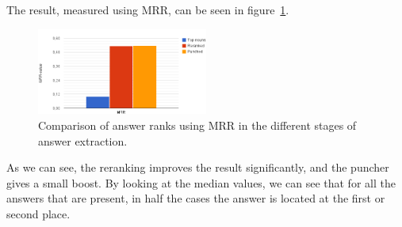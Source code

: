 The result, measured using MRR, can be seen in figure~\ref{fig:mrr}.
\begin{figure}[h!]
  \centering
  \hspace*{-0.6cm}
  \includegraphics[width=0.5\textwidth]{figures/mrr.png}
  \caption{Comparison of answer ranks using MRR in the different stages of answer extraction.}
  \label{fig:mrr}
\end{figure}

As we can see, the reranking improves the result significantly, and the puncher gives a small boost.
By looking at the median values, we can see that for all the answers that are present, 
in half the cases the answer is located at the first or second place.
